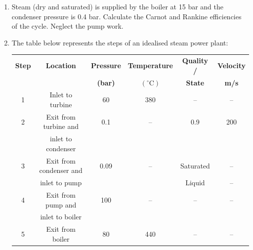 \documentclass[12pts,a4paper,amsmath,amssymb,floatfix]{article}%
\begin{document}
\begin{enumerate}[label=\bfseries Problem \arabic*]

\item\label{Tut03:CarnotEfficiency} Steam (dry and saturated) is supplied by the boiler at 15 bar and the condenser pressure is 0.4 bar. Calculate the Carnot and Rankine efficiencies of the cycle. Neglect the pump work.


\item\label{Tut03:SimpleSteamPowerPlant}The table below represents the steps of an idealised steam power plant:
    \begin{center}
     \begin{tabular}{||c | c | c | c | c | c ||}
      \hline\hline
       {\bf Step} & {\bf Location}       & {\bf Pressure}  & {\bf Temperature}     & {\bf Quality /}  &{\bf Velocity}    \\
                  &                      & {\bf (bar)}     &{\bf$\left(^{\circ}\text{C}\right)$}& {\bf State} & {\bf m/s} \\
      \hline\hline
          1       & Inlet to turbine     &   60            &   380                 &  --              &       --         \\
      \hline
          2       & Exit from turbine and&   0.1           &    --                 & 0.9              &  200             \\
                  & inlet to condenser   &                 &                       &                  &                  \\ 
      \hline
          3       & Exit from condenser and&  0.09         &  --                   & Saturated        &  --              \\
                  & inlet to pump        &                 &                       & Liquid           &   --             \\
      \hline
          4       & Exit from pump and   &  100            &   --                  &     --           &   --             \\
                  & inlet to boiler      &                 &                       &                  &                  \\
      \hline 
          5       & Exit from boiler     &  80             &  440                  &      --          &    --            \\
           \hline\hline
     \end{tabular}

\end{center}
\end{enumerate}
\end{document}
